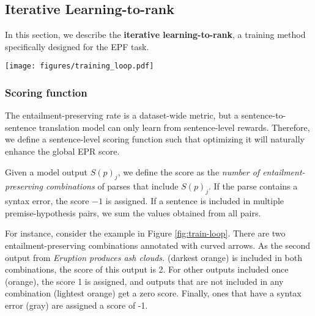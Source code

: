 
\subsection{Iterative Learning-to-rank}

In this section, we describe the \textbf{iterative learning-to-rank}, a training method specifically designed for the EPF task.

\begin{figure*}[th]
    \centering
    \texttt{[image: figures/training\_loop.pdf]}
    \caption{Iterative Learning-to-rank approach to train an entailment-preserving \nltofol\ translator. (1) For each premise and hypothesis, multiple FOL representations are sampled using beam search. (2) An external solver counts all entailment-preserving combinations and assigns scores. (3) Finally, the learning-to-rank objective BRIO is applied to reward the outputs participating in the most entailment-preserving combinations, indirectly increasing the overall EPR. This training loop (1-3) is repeated for multiple iterations to maximize performance.}
    \label{fig:train-loop}
\end{figure*}

\subsubsection{Scoring function}
\label{sec:scoring-func}

The entailment-preserving rate is a dataset-wide metric, but a sentence-to-sentence translation model can only learn from sentence-level rewards. Therefore, we define a sentence-level scoring function such that optimizing it will naturally enhance the global EPR score.

Given a model output $S(p)_{j}$, we define the score as the \textit{number of entailment-preserving combinations} of parses that include $S(p)_{j}$. If the parse contains a syntax error, the score $-1$ is assigned. If a sentence is included in multiple premise-hypothesis pairs, we sum the values obtained from all pairs.

For instance, consider the example in Figure \ref{fig:train-loop}. There are two entailment-preserving combinations annotated with curved arrows. As the second output from \textit{Eruption produces ash clouds.} (darkest orange) is included in both combinations, the score of this output is 2. For other outputs included once (orange), the score 1 is assigned, and outputs that are not included in any combination (lightest orange) get a zero score. Finally, ones that have a syntax error (gray) are assigned a score of -1.

